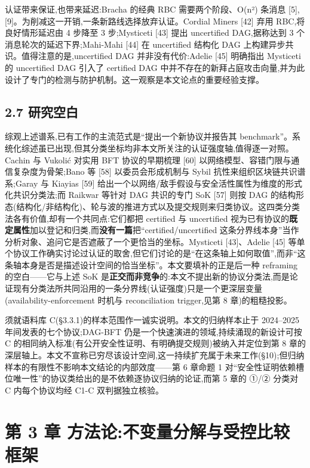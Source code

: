 \documentclass[UTF8,fontset=windows,a4paper,11pt]{ctexart}
\begin{document}
认证带来保证,也带来延迟:Bracha 的经典 RBC 需要两个阶段、O(n²) 条消息 {[}5{]}, {[}9{]}。为削减这一开销,一条新路线选择放弃认证。Cordial Miners {[}42{]} 弃用 RBC,将良好情形延迟由 4 步降至 3 步;Mysticeti {[}43{]} 提出 uncertified DAG,据称达到 3 个消息轮次的延迟下界;Mahi-Mahi {[}44{]} 在 uncertified 结构化 DAG 上构建异步共识。值得注意的是,uncertified DAG 并非没有代价:Adelie {[}45{]} 明确指出 Mysticeti 的 uncertified DAG 引入了 certified DAG 中并不存在的新拜占庭攻击向量,并为此设计了专门的检测与防护机制。这一观察是本文论点的重要经验支撑。

\subsection{2.7 研究空白}\label{ux7814ux7a76ux7a7aux767d}

综观上述谱系,已有工作的主流范式是``提出一个新协议并报告其 benchmark''。系统化综述虽已出现,但其分类坐标均非本文所关注的认证强度轴,值得逐一对照。Cachin 与 Vukolić 对实用 BFT 协议的早期梳理 {[}60{]} 以网络模型、容错门限与通信复杂度为骨架;Bano 等 {[}58{]} 以委员会形成机制与 Sybil 抗性来组织区块链共识谱系;Garay 与 Kiayias {[}59{]} 给出一个以网络/敌手假设与安全活性属性为维度的形式化共识分类法;而 Raikwar 等针对 DAG 共识的专门 SoK {[}57{]} 则按 DAG 的结构形态(结构化/非结构化)、轮与波的推进方式以及提交规则来归类协议。这四类分类法各有价值,却有一个共同点:它们都把 certified 与 uncertified 视为已有协议的\textbf{既定属性}加以登记和归类,而\textbf{没有一篇}把``certified/uncertified 这条分界线本身''当作分析对象、追问它是否遮蔽了一个更恰当的坐标。Mysticeti {[}43{]}、Adelie {[}45{]} 等单个协议工作确实讨论过认证的取舍,但它们讨论的是``在这条轴上如何取值'',而非``这条轴本身是否是描述设计空间的恰当坐标''。本文要填补的正是后一种 reframing 的空白------它与上述 SoK 是\textbf{正交而非竞争}的:本文不提出新的协议分类法,而是论证现有分类法所共同沿用的一条分界线(认证强度)只是一个更深层变量(availability-enforcement 时机与 reconciliation trigger,见第 8 章)的粗糙投影。

须就语料库 C(§3.3.1)的样本范围作一诚实说明。本文的归纳样本止于 2024--2025 年间发表的七个协议;DAG-BFT 仍是一个快速演进的领域,持续涌现的新设计可按 C 的相同纳入标准(有公开安全性证明、有明确提交规则)被纳入并定位到第 8 章的深层轴上。本文不宣称已穷尽该设计空间,这一持续扩充属于未来工作(§10);但归纳样本的有限性不影响本文结论的内部效度------第 6 章命题 1 对``安全性证明依赖槽位唯一性''的协议类给出的是不依赖逐协议归纳的论证,而第 5 章的 ①/② 分类对 C 内每个协议均经 C1-C 双判据独立核验。

\section{第 3 章
方法论:不变量分解与受控比较框架}\label{ux7b2c-3-ux7ae0-ux65b9ux6cd5ux8bbaux4e0dux53d8ux91cfux5206ux89e3ux4e0eux53d7ux63a7ux6bd4ux8f83ux6846ux67b6}
\end{document}
